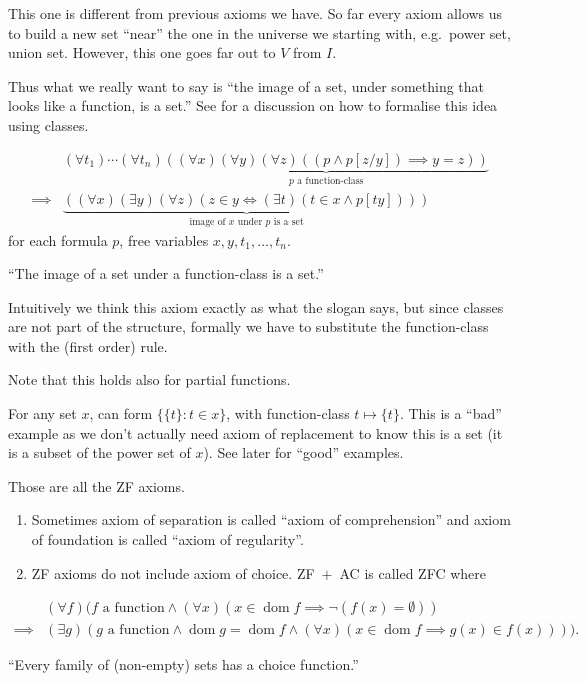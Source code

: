 \documentclass[a4paper]{article}
\DeclareMathOperator{\dom}{dom} %
\begin{document}
This one is different from previous axioms we have. So far every axiom allows us to build a new set ``near'' the one in the universe we starting with, e.g.\ power set, union set. However, this one goes far out to \(V\) from \(I\).

Thus what we really want to say is ``the image of a set, under something that looks like a function, is a set.'' See  for a discussion on how to formalise this idea using classes.

\begin{axiom*}
  \begin{align*}
    & (\forall t_1) \cdots (\forall t_n) \underbrace{((\forall x) (\forall y) (\forall z) ((p \land p[z/y]) \implies y = z))}_{p \text{ a function-class}} \\
    \implies & \underbrace{((\forall x) (\exists y) (\forall z) (z \in y \iff (\exists t) (t \in x \land p[ty])))}_{\text{image of \(x\) under \(p\) is a set}}
  \end{align*}
  for each formula \(p\), free variables \(x, y, t_1, \dots, t_n\).
\end{axiom*}
``The image of a set under a function-class is a set.''

Intuitively we think this axiom exactly as what the slogan says, but since classes are not part of the structure, formally we have to substitute the function-class with the (first order) rule.

Note that this holds also for partial functions.

\begin{eg}
  For any set \(x\), can form \(\{\{t\}: t \in x\}\), with function-class \(t \mapsto \{t\}\). This is a ``bad'' example as we don't actually need axiom of replacement to know this is a set (it is a subset of the power set of \(x\)). See later for ``good'' examples.
\end{eg}

Those are all the ZF axioms.

\begin{note}\leavevmode
  \begin{enumerate}
  \item Sometimes axiom of separation is called ``axiom of comprehension'' and axiom of foundation is called ``axiom of regularity''.
  \item ZF axioms do not include axiom of choice. ZF~\(+\)~AC is called ZFC where
  \end{enumerate}
\end{note}
\begin{axiom*}
  \begin{align*}
    & (\forall f) (f \text{ a function} \land (\forall x) (x \in \dom f \implies \neg (f(x) = \emptyset)) \\
    \implies & (\exists g) (g \text{ a function} \land \dom g = \dom f \land (\forall x) (x \in \dom f \implies g(x) \in f(x)))).
  \end{align*}
\end{axiom*}
``Every family of (non-empty) sets has a choice function.''
\end{document}
